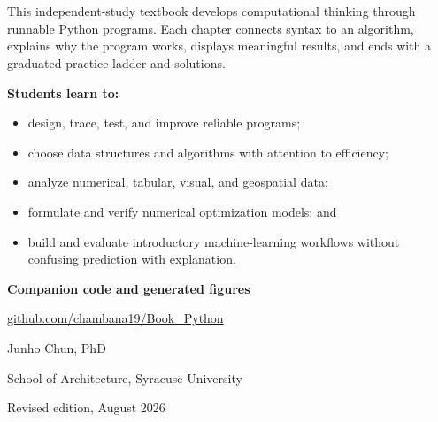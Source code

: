 \newpage
\thispagestyle{empty}

\vspace*{24mm}

\\[3mm]

\vspace{3mm}
\noindent{\color{BookBlue}\rule{0.92\textwidth}{1.75pt}}\\[8mm]

\begin{minipage}{0.86\textwidth}
This independent-study textbook develops computational thinking through
runnable Python programs. Each chapter connects syntax to an algorithm,
explains why the program works, displays meaningful results, and ends with a
graduated practice ladder and solutions.

\vspace{5mm}
\textbf{Students learn to:}
\begin{itemize}
    \item design, trace, test, and improve reliable programs;
    \item choose data structures and algorithms with attention to efficiency;
    \item analyze numerical, tabular, visual, and geospatial data;
    \item formulate and verify numerical optimization models; and
    \item build and evaluate introductory machine-learning workflows without
          confusing prediction with explanation.
\end{itemize}

\vspace{5mm}
\textbf{Companion code and generated figures}\par
\href{https://github.com/chambana19/Book_Python}{github.com/chambana19/Book\_Python}

\vspace{5mm}
Junho Chun, PhD\par
School of Architecture, Syracuse University\par
Revised edition, August 2026
\end{minipage}

\vfill
\noindent{\color{BookOrange}\rule{0.92\textwidth}{1.1pt}}
